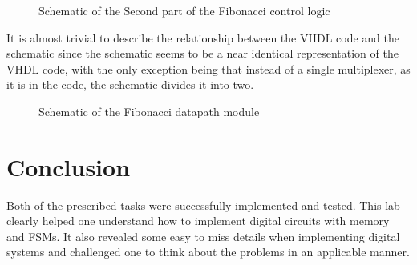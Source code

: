\documentclass[10pt]{article}
\begin{document}
\begin{figure}[ht]
    \centering
    \caption{Schematic of the Second part of the Fibonacci control logic}
    \label{fig:control_schematic_B}
\end{figure}
\newpage
It is almost trivial to describe the relationship between the VHDL code and the schematic since the schematic seems to be a near identical representation of the VHDL code, with the only exception being that instead of a single multiplexer, as it is in the code, the schematic divides it into two.
\begin{figure}[ht]
    \centering
    \caption{Schematic of the Fibonacci datapath module}
    \label{fig:datapath_schematic}
\end{figure}
\newpage

 \section{Conclusion}
 Both of the prescribed tasks were successfully implemented and tested. This lab clearly helped one understand how to implement digital circuits with memory and FSMs. It also revealed some easy to miss details when implementing digital systems and challenged one to think about the problems in an applicable manner.
 
 
 \newpage
 
\end{document}
